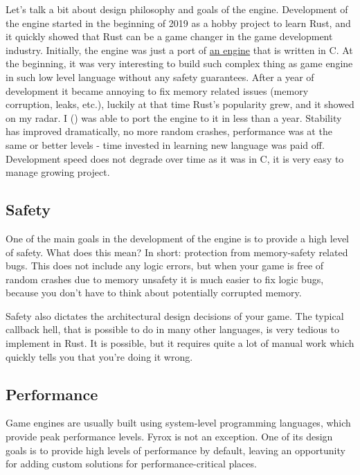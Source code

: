 \documentclass[
]{book}
\theoremstyle{definition}
\theoremstyle{definition}
\theoremstyle{definition}
\theoremstyle{definition}
\theoremstyle{remark}
\begin{document}
Let's talk a bit about design philosophy and goals of the engine. Development of the engine started in the beginning
of 2019 as a hobby project to learn Rust, and it quickly showed that Rust can be a game changer in the game development
industry. Initially, the engine was just a port of \href{https://github.com/mrDIMAS/DmitrysEngine}{an engine} that is written
in C. At the beginning, it was very interesting to build such complex thing as game engine in such low level language without
any safety guarantees. After a year of development it became annoying to fix memory related issues (memory corruption,
leaks, etc.), luckily at that time Rust's popularity grew, and it showed on my radar. I (\href{https://github.com/mrDIMAS}{\citet{mrDIMAS}})
was able to port the engine to it in less than a year. Stability has improved dramatically, no more random crashes,
performance was at the same or better levels - time invested in learning new language was paid off. Development speed
does not degrade over time as it was in C, it is very easy to manage growing project.

\subsection{Safety}\label{safety}

One of the main goals in the development of the engine is to provide a high level of safety. What does this mean?
In short: protection from memory-safety related bugs. This does not include any logic errors, but when your game is free
of random crashes due to memory unsafety it is much easier to fix logic bugs, because you don't have to think about
potentially corrupted memory.

Safety also dictates the architectural design decisions of your game. The typical callback hell, that is possible to do in
many other languages, is very tedious to implement in Rust. It is possible, but it requires quite a lot of manual work
which quickly tells you that you're doing it wrong.

\subsection{Performance}\label{performance}

Game engines are usually built using system-level programming languages, which provide peak performance levels. Fyrox is not
an exception. One of its design goals is to provide high levels of performance by default, leaving an opportunity for
adding custom solutions for performance-critical places.
\end{document}

